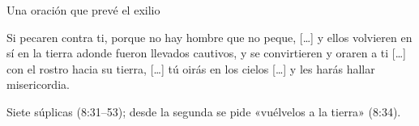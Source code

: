 \begin{frame}{Una oración que prevé el exilio}
\par\medskip
\begin{cita}Si pecaren contra ti, porque no hay hombre que no peque, [\ldots] y ellos volvieren en sí en la tierra adonde fueron llevados cautivos, y se convirtieren y oraren a ti [\ldots] con el rostro hacia su tierra, [\ldots] tú oirás en los cielos [\ldots] y les harás hallar misericordia.\end{cita}
\vspace{6pt}
\begin{clave}\footnotesize Siete súplicas (8:31--53); desde la segunda se pide «vuélvelos a la tierra» (8:34). \end{clave}
\end{frame}

